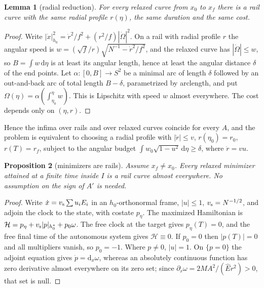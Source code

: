 \documentclass[aip,jmp,amsmath,amssymb,reprint]{revtex4-2}
\newcommand{\Ehat}{\hat E}
\newcommand{\dd}{\mathrm{d}}
\theoremstyle{plain}
\newtheorem{proposition}{Proposition}[section]
\newtheorem{lemma}[proposition]{Lemma}
\theoremstyle{definition}
\begin{document}
\begin{lemma}[radial reduction]\label{lem:radial-red}
For every relaxed curve from $x_0$ to $x_f$ there is a rail curve with the same radial
profile $r(\eta)$, the same duration and the same cost.
\end{lemma}

\begin{proof}
Write $|\dot x|^2_{h_0}=\dot r^2/f^2+(r^2/f)|\dot\Omega|^2$. On a rail with radial profile $r$
the angular speed is $w=(\sqrt f/r)\sqrt{N^{-1}-\dot r^2/f^2}$, and the relaxed curve has
$|\dot\Omega|\le w$, so $B=\int w\,\dd\eta$ is at least its angular length, hence at least the
angular distance $\delta$ of the end points. Let $\alpha:[0,B]\to S^2$ be a minimal arc of
length $\delta$ followed by an out-and-back arc of total length $B-\delta$, parametrized by
arclength, and put $\Omega(\eta)=\alpha(\int_{\eta_0}^\eta w)$. This is Lipschitz with speed
$w$ almost everywhere. The cost depends only on $(\eta,r)$.
\end{proof}

Hence the infima over rails and over relaxed curves coincide for every $A$, and the problem
is equivalent to choosing a radial profile with $|\dot r|\le v$, $r(\eta_0)=r_0$, $r(T)=r_f$,
subject to the angular budget $\int w_0\sqrt{1-u^2}\,\dd\eta\ge\delta$, where $\dot r=vu$.

\begin{proposition}[minimizers are rails]\label{prop:tau-rail}
Assume $x_f\neq x_0$. Every relaxed minimizer attained at a finite time inside $I$ is a rail
curve almost everywhere. No assumption on the sign of $A'$ is needed.
\end{proposition}

\begin{proof}
Write $\dot x=v_{\rm s}\sum u_iE_i$ in an $h_0$-orthonormal frame, $|u|\le1$, $v_{\rm s}=N^{-1/2}$,
and adjoin the clock to the state, with costate $p_\eta$. The maximized Hamiltonian is
$\mathcal H=p_\eta+v_{\rm s}|p|_{h_0^*}+p_0\omega$. The free clock at the target gives $p_\eta(T)=0$, and the
free final time of the autonomous system gives $\mathcal H\equiv0$. If $p_0=0$ then
$|p(T)|=0$ and all multipliers vanish, so $p_0=-1$. Where $p\neq0$, $|u|=1$. On $\{p=0\}$ the
adjoint equation gives $\dot p=\dd_x\omega$, whereas an absolutely continuous function has
zero derivative almost everywhere on its zero set; since
$\partial_r\omega=2MA^2/(\Ehat r^2)>0$, that set is null.
\end{proof}
\end{document}
